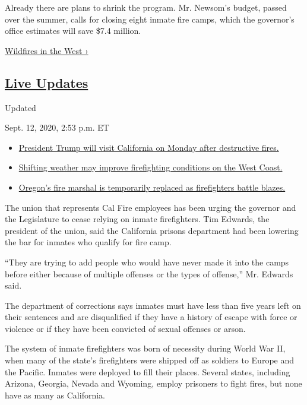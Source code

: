 Already there are plans to shrink the program. Mr. Newsom's budget,
passed over the summer, calls for closing eight inmate fire camps, which
the governor's office estimates will save \$7.4 million.

\href{https://www.nytimes3xbfgragh.onion/spotlight/california-wildfires}{Wildfires
in the West ›}

\hypertarget{live-updates}{%
\subsection{\texorpdfstring{\href{https://www.nytimes3xbfgragh.onion/2020/09/12/us/wildfires-live-updates.html}{Live
Updates}}{Live Updates}}\label{live-updates}}

Updated~

Sept. 12, 2020, 2:53 p.m. ET

\begin{itemize}
\tightlist
\item
  \href{https://www.nytimes3xbfgragh.onion/2020/09/12/us/wildfires-live-updates.html\#link-f3961ff}{President
  Trump will visit California on Monday after destructive fires.}
\item
  \href{https://www.nytimes3xbfgragh.onion/2020/09/12/us/wildfires-live-updates.html\#link-7e503ae9}{Shifting
  weather may improve firefighting conditions on the West Coast.}
\item
  \href{https://www.nytimes3xbfgragh.onion/2020/09/12/us/wildfires-live-updates.html\#link-5e4c548d}{Oregon's
  fire marshal is temporarily replaced as firefighters battle blazes.}
\end{itemize}

The union that represents Cal Fire employees has been urging the
governor and the Legislature to cease relying on inmate firefighters.
Tim Edwards, the president of the union, said the California prisons
department had been lowering the bar for inmates who qualify for fire
camp.

``They are trying to add people who would have never made it into the
camps before either because of multiple offenses or the types of
offense,'' Mr. Edwards said.

The department of corrections says inmates must have less than five
years left on their sentences and are disqualified if they have a
history of escape with force or violence or if they have been convicted
of sexual offenses or arson.

The system of inmate firefighters was born of necessity during World War
II, when many of the state's firefighters were shipped off as soldiers
to Europe and the Pacific. Inmates were deployed to fill their places.
Several states, including Arizona, Georgia, Nevada and Wyoming, employ
prisoners to fight fires, but none have as many as California.

